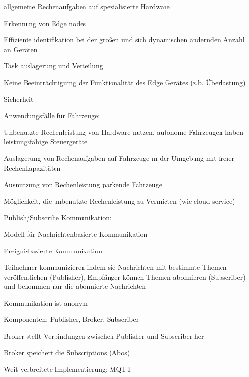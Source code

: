 \begin{notes}
\begin{notes}
        \begin{notes}
            \item allgemeine Rechenaufgaben auf spezialisierte Hardware
            \item Erkennung von Edge nodes
            \item Effiziente identifikation bei der großen und sich dynamischen ändernden Anzahl an Geräten
            \item Task auslagerung und Verteilung
            \item Keine Beeinträchtigumg der Funktionalität des Edge Gerätes (z.b. Überlastung)
            \item Sicherheit
        \end{notes}
        \item Anwendungsfälle für Fahrzeuge:
            \begin{notes}
                \item Unbenutzte Rechenleistung von Hardware nutzen, autonome Fahrzeugen haben leistungsfähige Steuergeräte
                \item Auslagerung von Rechenaufgaben auf Fahrzeuge in der Umgebung mit freier Rechenkapazitäten
                \item Ausnutzung von Rechenleistung parkende Fahrzeuge
                \item Möglichkeit, die unbenutzte Rechenleistung zu Vermieten (wie cloud service)
            \end{notes}
        \item Publish/Subscribe Kommunikation:
            \begin{notes}
                \item Modell für Nachrichtenbasierte Kommunikation \cite{MadeWirawan2018}
                \item Ereignisbasierte Kommunikation
                \item Teilnehmer kommunizieren indem sie Nachrichten mit bestimmte Themen veröffentlichen (Publisher), Empfänger können Themen abonnieren (Subscriber) und bekommen nur die abonnierte Nachrichten
                \item Kommunikation ist anonym
                \item Komponenten: Publisher, Broker, Subscriber
                \item Broker stellt Verbindungen zwischen Publisher und Subscriber her
                \item Broker speichert die Subscriptions (Abos)
                \item Weit verbreitete Implementierung: MQTT

\end{notes}
\end{notes}
\end{notes}
